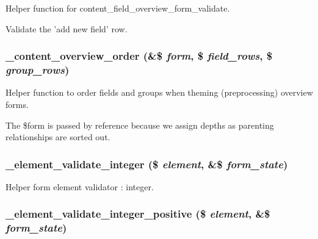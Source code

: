 Helper function for content\_\-field\_\-overview\_\-form\_\-validate.

Validate the 'add new field' row. \hypertarget{content_8admin_8inc_cf99115634a38f199e206785e19b2224}{
\subsubsection[{\_\-content\_\-overview\_\-order}]{\setlength{\rightskip}{0pt plus 5cm}\_\-content\_\-overview\_\-order (\&\$ {\em form}, \/  \$ {\em field\_\-rows}, \/  \$ {\em group\_\-rows})}}
\label{content_8admin_8inc_cf99115634a38f199e206785e19b2224}


Helper function to order fields and groups when theming (preprocessing) overview forms.

The \$form is passed by reference because we assign depths as parenting relationships are sorted out. \hypertarget{content_8admin_8inc_f34002ccec2a5ae0697cc23cac5cf9f1}{
\subsubsection[{\_\-element\_\-validate\_\-integer}]{\setlength{\rightskip}{0pt plus 5cm}\_\-element\_\-validate\_\-integer (\$ {\em element}, \/  \&\$ {\em form\_\-state})}}
\label{content_8admin_8inc_f34002ccec2a5ae0697cc23cac5cf9f1}


Helper form element validator : integer. \hypertarget{content_8admin_8inc_8a204417f7ec4289d828b223afa22c57}{
\subsubsection[{\_\-element\_\-validate\_\-integer\_\-positive}]{\setlength{\rightskip}{0pt plus 5cm}\_\-element\_\-validate\_\-integer\_\-positive (\$ {\em element}, \/  \&\$ {\em form\_\-state})}}
\label{content_8admin_8inc_8a204417f7ec4289d828b223afa22c57}


